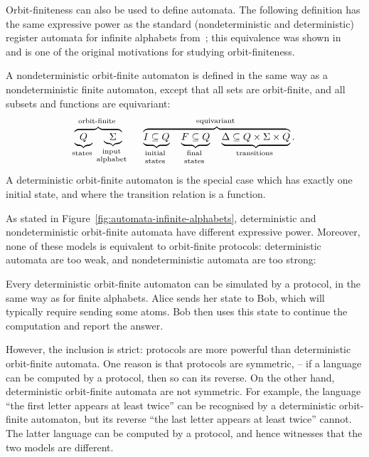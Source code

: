 Orbit-finiteness can also be used to define automata. The following definition has the same expressive power as the standard (nondeterministic and deterministic) register automata for infinite alphabets from~\cite{kaminskiFiniteMemoryAutomata1994}; this equivalence was shown in~\cite[Lemma 6.3]{bojanczykAutomataTheoryNominal2014} and is one of the original motivations for studying orbit-finiteness.

\begin{definition}
    \label{def:orbit-finite-automata}
    A nondeterministic orbit-finite automaton is defined in the same way as a nondeterministic finite automaton, except that all sets are orbit-finite, and all subsets and functions are equivariant: 
\begin{align*}
    \myoverbrace{
        \myunderbrace{Q}{states} \quad 
        \myunderbrace{\Sigma}{input \\ alphabet}
    }
    {orbit-finite}
    \qquad
    \myoverbrace{
        \myunderbrace{I \subseteq Q}{initial \\ states} \quad 
        \myunderbrace{F \subseteq Q}{final \\ states} \quad 
        \myunderbrace{\Delta \subseteq Q \times \Sigma \times Q}{transitions}
    }{equivariant}.
\end{align*}
A deterministic orbit-finite automaton is the special case which has exactly one initial state, and where the transition relation is a function.
\end{definition}

As stated in Figure~\ref{fig:automata-infinite-alphabets}, deterministic and nondeterministic orbit-finite automata have different expressive power. Moreover, none of these models is equivalent to orbit-finite protocols: deterministic automata are too weak, and nondeterministic automata are too strong:

\begin{myexample}
    \label{ex:protocol-not-dofa}
     Every deterministic orbit-finite automaton can be simulated by a protocol, in the same way as for finite alphabets. Alice sends her state to Bob, which will typically require sending some atoms. Bob then uses this state to continue the computation and report the answer. 
    
    However, the inclusion is strict: protocols are more powerful than deterministic orbit-finite automata. One reason is that protocols are symmetric, -- if a language can be computed by a protocol, then so can its reverse. On the other hand, deterministic orbit-finite automata are not symmetric. For example, the language ``the first letter appears at least twice'' can be recognised by a deterministic orbit-finite automaton, but its reverse ``the last letter appears at least twice'' cannot. The latter language can be computed by a protocol, and hence witnesses that the two models are different. 
\end{myexample}

